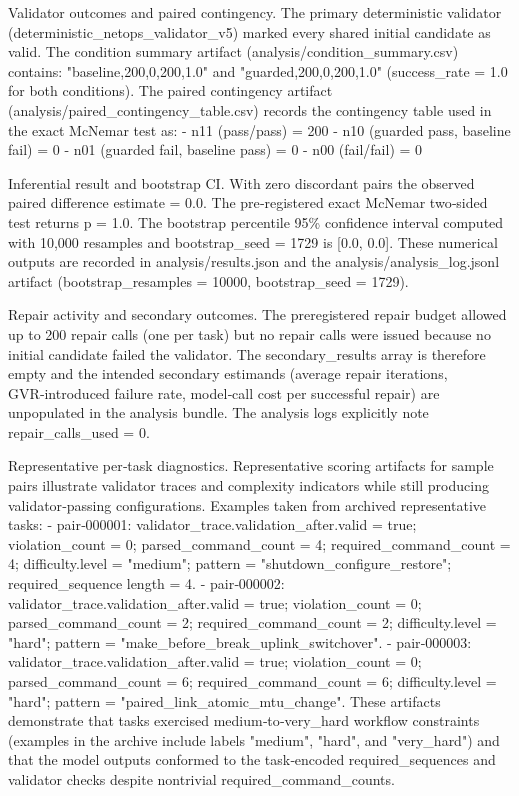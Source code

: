 \documentclass[conference]{IEEEtran}
\begin{document}
Validator outcomes and paired contingency. The primary deterministic validator (deterministic\_netops\_validator\_v5) marked every shared initial candidate as valid. The condition summary artifact (analysis/condition\_summary.csv) contains: "baseline,200,0,200,1.0" and "guarded,200,0,200,1.0" (success\_rate = 1.0 for both conditions). The paired contingency artifact (analysis/paired\_contingency\_table.csv) records the contingency table used in the exact McNemar test as:
- n11 (pass/pass) = 200
- n10 (guarded pass, baseline fail) = 0
- n01 (guarded fail, baseline pass) = 0
- n00 (fail/fail) = 0

Inferential result and bootstrap CI. With zero discordant pairs the observed paired difference estimate = 0.0. The pre‑registered exact McNemar two‑sided test returns p = 1.0. The bootstrap percentile 95\% confidence interval computed with 10,000 resamples and bootstrap\_seed = 1729 is [0.0, 0.0]. These numerical outputs are recorded in analysis/results.json and the analysis/analysis\_log.jsonl artifact (bootstrap\_resamples = 10000, bootstrap\_seed = 1729).

Repair activity and secondary outcomes. The preregistered repair budget allowed up to 200 repair calls (one per task) but no repair calls were issued because no initial candidate failed the validator. The secondary\_results array is therefore empty and the intended secondary estimands (average repair iterations, GVR‑introduced failure rate, model‑call cost per successful repair) are unpopulated in the analysis bundle. The analysis logs explicitly note repair\_calls\_used = 0.

Representative per‑task diagnostics. Representative scoring artifacts for sample pairs illustrate validator traces and complexity indicators while still producing validator‑passing configurations. Examples taken from archived representative tasks:
- pair‑000001: validator\_trace.validation\_after.valid = true; violation\_count = 0; parsed\_command\_count = 4; required\_command\_count = 4; difficulty.level = "medium"; pattern = "shutdown\_configure\_restore"; required\_sequence length = 4.
- pair‑000002: validator\_trace.validation\_after.valid = true; violation\_count = 0; parsed\_command\_count = 2; required\_command\_count = 2; difficulty.level = "hard"; pattern = "make\_before\_break\_uplink\_switchover".
- pair‑000003: validator\_trace.validation\_after.valid = true; violation\_count = 0; parsed\_command\_count = 6; required\_command\_count = 6; difficulty.level = "hard"; pattern = "paired\_link\_atomic\_mtu\_change".
These artifacts demonstrate that tasks exercised medium‑to‑very\_hard workflow constraints (examples in the archive include labels "medium", "hard", and "very\_hard") and that the model outputs conformed to the task‑encoded required\_sequences and validator checks despite nontrivial required\_command\_counts.
\end{document}
